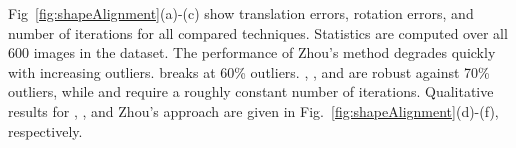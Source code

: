 Fig~\ref{fig:shapeAlignment}(a)-(c) show translation errors, rotation errors, and number of iterations for all compared techniques. 
 Statistics are computed over all 600 images in the \FGCar dataset. The performance of Zhou's method degrades quickly with increasing outliers.
  \ransac breaks at 60\% outliers. %
  \GNCGM, \GNCTLS, and \adapt are robust against 70\% outliers, while \GNCGM and \GNCTLS require a roughly constant number of iterations. %
  Qualitative results for \GNCGM, \ransac, and Zhou's approach are given in Fig.~\ref{fig:shapeAlignment}(d)-(f), respectively.